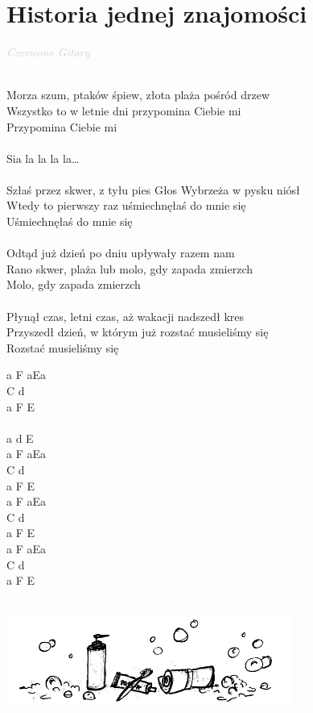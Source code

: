 \documentclass[a5paper, 10pt]{book}
\begin{document}
\newpage
\section{Historia jednej znajomości}\textcolor{lightgray}{\textit{Czerwone Gitary}}\\~\\
\begin{minipage}[t]{0.8\textwidth}
Morza szum, ptaków śpiew, złota plaża pośród drzew\\
Wszystko to w letnie dni przypomina Ciebie mi\\
Przypomina Ciebie mi\\
\\
\hspace*{5mm}Sia la la la la…\\
\\
Szłaś przez skwer, z tyłu pies Głos Wybrzeża w pysku niósł\\
Wtedy to pierwszy raz uśmiechnęłaś do mnie się\\
Uśmiechnęłaś do mnie się\\
\\
Odtąd już dzień po dniu upływały razem nam\\
Rano skwer, plaża lub molo, gdy zapada zmierzch\\
Molo, gdy zapada zmierzch\\
\\
Płynął czas, letni czas, aż wakacji nadszedł kres\\
Przyszedł dzień, w którym już rozstać musieliśmy się\\
Rozstać musieliśmy się\\
\end{minipage}
\begin{minipage}[t]{0.2\textwidth}
a F aEa\\
C d\\
a F E\\
\\
a d E\\

a F aEa\\
C d\\
a F E\\

a F aEa\\
C d\\
a F E\\

a F aEa\\
C d\\
a F E\\
\end{minipage}
\vspace*{2cm}\\
\includegraphics[width = 0.7\textwidth, center]{images/historia_jednej_znajomosci.png}\\
\end{document}
